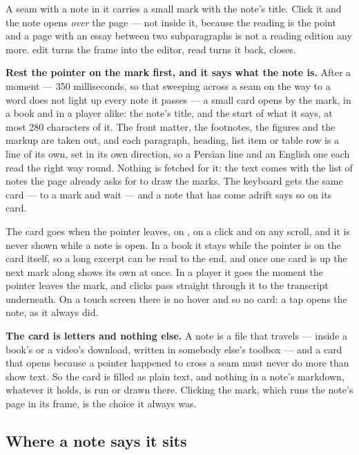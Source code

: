 \documentclass[11pt,oneside]{report}
\newcommand{\key}[1]{\textsf{\small\fbox{#1}}}
\newcommand{\menu}[1]{\textsf{#1}}
\begin{document}
A seam with a note in it carries a small mark with the note's title. Click it
and the note opens \emph{over} the page --- not inside it, because the
reading is the point and a page with an essay between two subparagraphs is
not a reading edition any more. \menu{edit} turns the frame into the editor,
\menu{read} turns it back, \key{Esc} closes.

\textbf{Rest the pointer on the mark first, and it says what the note is.}
After a moment --- 350 milliseconds, so that sweeping across a seam on the
way to a word does not light up every note it passes --- a small card opens
by the mark, in a book and in a player alike: the note's title, and the
start of what it says, at most 280 characters of it. The front matter, the
footnotes, the figures and the markup are taken out, and each paragraph,
heading, list item or table row is a line of its own, set in its own
direction, so a Persian line and an English one each read the right way
round. Nothing is fetched for it: the text comes with the list of notes the
page already asks for to draw the marks. The keyboard gets the same card ---
\key{Tab} to a mark and wait --- and a note that has come adrift says so on
its card.

The card goes when the pointer leaves, on \key{Esc}, on a click and on any
scroll, and it is never shown while a note is open. In a book it stays while
the pointer is on the card itself, so a long excerpt can be read to the end,
and once one card is up the next mark along shows its own at once. In a
player it goes the moment the pointer leaves the mark, and clicks pass
straight through it to the transcript underneath. On a touch screen there is
no hover and so no card: a tap opens the note, as it always did.

\begin{goodbox}
\textbf{The card is letters and nothing else.} A note is a file that
travels --- inside a book's or a video's download, written in somebody
else's toolbox --- and a card that opens because a pointer happened to cross
a seam must never do more than show text. So the card is filled as plain
text, and nothing in a note's markdown, whatever it holds, is run or drawn
there. Clicking the mark, which runs the note's page in its frame, is the
choice it always was.
\end{goodbox}

\subsection*{Where a note says it sits}
\end{document}
